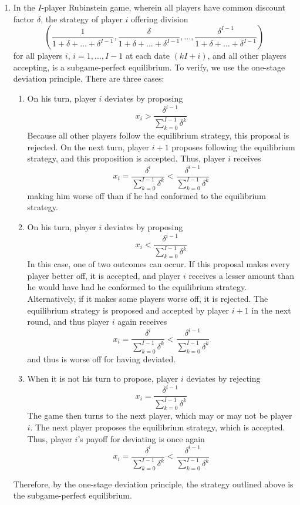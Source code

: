 \documentclass[11pt]{article}
\begin{document}
\begin{enumerate}
	\item In the $ I $-player Rubinstein game, wherein all players have common discount factor $\delta$, the strategy of player $ i $ offering division 
	\[\left(\frac{1}{1 + \delta + \dots + \delta^{I - 1}}, \frac{\delta}{1 + \delta + \dots + \delta^{I - 1}}, \dots, \frac{\delta^{I - 1}}{1 + \delta + \dots + \delta^{I - 1}} \right)\]
	for all players $ i $, $ i = 1, \dots, I - 1 $ at each date $ (kI + i) $, and all other players accepting, is a subgame-perfect equilibrium. To verify, we use the one-stage deviation principle. There are three cases:
	\begin{enumerate}[label = \Roman{*}. ]
		\item On his turn, player $ i $ deviates by proposing \[x_i > \frac{\delta^{i - 1}}{\sum_{k = 0}^{I - 1} \delta^k}\]
		Because all other players follow the equilibrium strategy, this proposal is rejected. On the next turn, player $ i + 1 $ proposes following the equilibrium strategy, and this proposition is accepted. Thus, player $ i $ receives
		\[x_i = \frac{\delta^{i}}{\sum_{k = 0}^{I - 1} \delta^k} < \frac{\delta^{i - 1}}{\sum_{k = 0}^{I - 1} \delta^k}\]
		making him worse off than if he had conformed to the equilibrium strategy.
		
		\item On his turn, player $ i $ deviates by proposing \[x_i < \frac{\delta^{i - 1}}{\sum_{k = 0}^{I - 1} \delta^k}\] In this case, one of two outcomes can occur. If this proposal makes every player better off, it is accepted, and player $ i $ receives a lesser amount than he would have had he conformed to the equilibrium strategy. Alternatively, if it makes some players worse off, it is rejected. The equilibrium strategy is proposed and accepted by player $ i+1 $ in the next round, and thus player $ i $ again receives 
		\[x_i = \frac{\delta^{i}}{\sum_{k = 0}^{I - 1} \delta^k} < \frac{\delta^{i - 1}}{\sum_{k = 0}^{I - 1} \delta^k}\]
		and thus is worse off for having deviated.
		
		\item When it is not his turn to propose, player $ i $ deviates by rejecting 
		\[x_i = \frac{\delta^{i - 1}}{\sum_{k = 0}^{I - 1} \delta^k}\]
		The game then turns to the next player, which may or may not be player $ i $. The next player proposes the equilibrium strategy, which is accepted. Thus, player $ i $'s payoff for deviating is once again 
		\[x_i = \frac{\delta^{i}}{\sum_{k = 0}^{I - 1} \delta^k} < \frac{\delta^{i - 1}}{\sum_{k = 0}^{I - 1} \delta^k}\]
	\end{enumerate}
	Therefore, by the one-stage deviation principle, the strategy outlined above is the subgame-perfect equilibrium. 
	

\end{enumerate}
\end{document}
